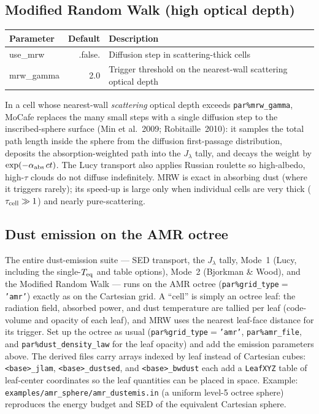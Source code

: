 \documentclass[english,a4paper]{kiseon_memo}
\newcommand{\pp}[1]{\texttt{par\%#1}}
\newcommand{\code}[1]{\texttt{#1}}
\newcommand{\file}[1]{\texttt{#1}}
\begin{document}
\subsection{Modified Random Walk (high optical depth)}\label{sec:mrw}
\begin{longtable}{P D X}
\toprule
\textrm{Parameter} & \textrm{Default} & \textrm{Description}\\
\midrule \endhead
use\_mrw           & .false. & Diffusion step in scattering-thick cells\\
mrw\_gamma         & 2.0     & Trigger threshold on the nearest-wall scattering optical depth\\
\bottomrule
\end{longtable}
In a cell whose nearest-wall \emph{scattering} optical depth exceeds
\pp{mrw\_gamma}, MoCafe replaces the many small steps with a single diffusion
step to the inscribed-sphere surface (Min et al.~2009; Robitaille~2010): it
samples the total path length inside the sphere from the diffusion
first-passage distribution, deposits the absorption-weighted path into the
$J_\lambda$ tally, and decays the weight by $\exp(-\alpha_{\rm abs}\,c t)$.  The
Lucy transport also applies Russian roulette so high-albedo, high-$\tau$ clouds
do not diffuse indefinitely.  MRW is exact in absorbing dust (where it triggers
rarely); its speed-up is large only when individual cells are very thick
($\tau_{\rm cell}\gg 1$) and nearly pure-scattering.

\subsection{Dust emission on the AMR octree}\label{sec:amremission}
The entire dust-emission suite --- SED transport, the $J_\lambda$ tally, Mode~1
(Lucy, including the single-$T_{\rm eq}$ and table options), Mode~2 (Bjorkman
\& Wood), and the Modified Random Walk --- runs on the AMR octree
(\pp{grid\_type}${}={}$\code{'amr'}) exactly as on the Cartesian grid.  A
``cell'' is simply an octree leaf: the radiation field, absorbed power, and
dust temperature are tallied per leaf (code-volume and opacity of each leaf), and
MRW uses the nearest leaf-face distance for its trigger.  Set up the octree as
usual (\pp{grid\_type}${}={}$\code{'amr'}, \pp{amr\_file}, and \pp{dust\_density\_law}
for the leaf opacity) and add the emission parameters above.  The derived files
carry
arrays indexed by leaf instead of Cartesian cubes: \file{<base>\_jlam},
\file{<base>\_dustsed}, and \file{<base>\_bwdust} each add a \code{LeafXYZ}
table of leaf-center coordinates so the leaf quantities can be placed in
space.  Example: \file{examples/amr\_sphere/amr\_dustemis.in} (a uniform
level-5 octree sphere) reproduces the energy budget and SED of the equivalent
Cartesian sphere.
\end{document}
